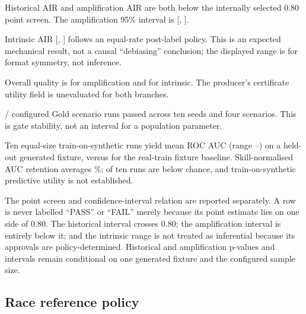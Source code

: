 \begin{KeyBox}
\begin{KeyValueList}
\item[Fairness signal] Historical AIR \HistoricalAIR{} and amplification AIR \AmplificationAIR{}
are both below the internally selected 0.80 point screen. The amplification 95\% interval is
[\AmplificationAIRLower{}, \AmplificationAIRUpper{}].
\item[Branch control] Intrinsic AIR \IntrinsicAIR{} [\IntrinsicAIRLower{}, \IntrinsicAIRUpper{}]
follows an equal-rate post-label policy. This is an expected mechanical result, not a causal
``debiasing'' conclusion; the displayed range is for format symmetry, not inference.
\item[Quality] Overall quality is \AmplificationQuality{} for amplification and
\IntrinsicQuality{} for intrinsic. The producer's certificate utility field is unevaluated for
both branches.
\item[Robustness] \RobustnessTotalPasses{}/\RobustnessTotalRuns{} configured Gold scenario runs
passed across ten seeds and four scenarios. This is gate stability, not an interval for a
population parameter.
\item[Utility study] Ten equal-size train-on-synthetic runs yield mean ROC AUC
\UtilitySyntheticAUCMean{} (range \UtilitySyntheticAUCMin{}--\UtilitySyntheticAUCMax{}) on a
held-out generated fixture, versus \UtilityBaselineAUC{} for the real-train fixture baseline.
Skill-normalised AUC retention averages \UtilitySkillRetentionMeanPct{}\%;
\UtilityBelowChanceSeedCount{} of ten runs are below chance, and train-on-synthetic predictive
utility is not established.
\end{KeyValueList}
\end{KeyBox}

The point screen and confidence-interval relation are reported separately. A row is never labelled
``PASS'' or ``FAIL'' merely because its point estimate lies on one side of 0.80. The historical
interval crosses 0.80; the amplification interval is entirely below it; and the intrinsic range is
not treated as inferential because its approvals are policy-determined. Historical and
amplification p-values and intervals remain conditional on one generated fixture and the configured
sample size.

\subsection{Race reference policy}

